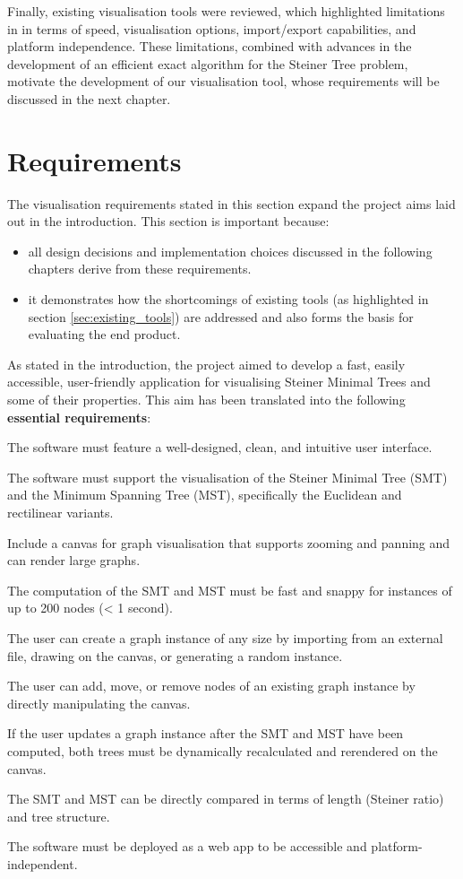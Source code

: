 \documentclass{l4proj}
\begin{document}
Finally, existing visualisation tools were reviewed, which highlighted limitations in in terms of speed, visualisation options, import/export capabilities, and platform independence. These limitations, combined with advances in the development of an efficient exact algorithm for the Steiner Tree problem, motivate the development of our visualisation tool, whose requirements will be discussed in the next chapter.

\chapter{Requirements}
\label{sec:requirements}

The visualisation requirements stated in this section expand the project aims laid out in the introduction. This section is important because:
\begin{itemize}
    \item all design decisions and implementation choices discussed in the following chapters derive from these requirements.
    \item it demonstrates how the shortcomings of existing tools (as highlighted in section \ref{sec:existing_tools}) are addressed and also forms the basis for evaluating the end product.
\end{itemize}
As stated in the introduction, the project aimed to develop a fast, easily accessible, user-friendly application for visualising Steiner Minimal Trees and some of their properties.
This aim has been translated into the following \textbf{essential requirements}:
\begin{requirements}
    \item The software must feature a well-designed, clean, and intuitive user interface.
    \item The software must support the visualisation of the Steiner Minimal Tree (SMT) and the Minimum Spanning Tree (MST), specifically the Euclidean and rectilinear variants.
    \item Include a canvas for graph visualisation that supports zooming and panning and can render large graphs.
    \item The computation of the SMT and MST must be fast and snappy for instances of up to 200 nodes (< 1 second).
    \item The user can create a graph instance of any size by importing from an external file, drawing on the canvas, or generating a random instance.
    \item The user can add, move, or remove nodes of an existing graph instance by directly manipulating the canvas.
    \item If the user updates a graph instance after the SMT and MST have been computed, both trees must be dynamically recalculated and rerendered on the canvas.
    \item The SMT and MST can be directly compared in terms of length (Steiner ratio) and tree structure.
    \item The software must be deployed as a web app to be accessible and platform-independent.

\end{requirements}
\end{document}
